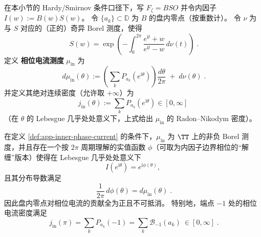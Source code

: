 \begin{definition}[内因子相位电流测度]\label{def:app-inner-phase-current}
在本小节的 Hardy/Smirnov 条件口径下，写 \(F_{\zeta}=BSO\) 并令内因子 \(I(w):=B(w)S(w)\)。
令 \(\{a_k\}\subset\mathbb{D}\) 为 \(B\) 的盘内零点（按重数计）。
令 \(\nu\) 为与 \(S\) 对应的（正的）奇异 Borel 测度，使得
\begin{equation}\label{eq:app-singular-inner-factor-measure}
\boxed{\;
S(w)
=\exp\!\left(
-\int_{0}^{2\pi}\frac{e^{\mathrm{i}t}+w}{e^{\mathrm{i}t}-w}\,d\nu(t)
\right)\; }.
\end{equation}
定义 \textbf{相位电流测度} \(\mu_{\mathrm{in}}\) 为
\begin{equation}\label{eq:app-inner-phase-current-measure}
\boxed{\;
d\mu_{\mathrm{in}}(\theta)
:=
\left(\sum_k P_{a_k}(e^{\mathrm{i}\theta})\right)\frac{d\theta}{2\pi}
\;+\;
d\nu(\theta)\; }.
\end{equation}
并定义其绝对连续密度（允许取 \(+\infty\)）为
\begin{equation}\label{eq:app-inner-phase-current-density}
\boxed{\;
j_{\mathrm{in}}(\theta):=\sum_k P_{a_k}(e^{\mathrm{i}\theta})\in[0,\infty]\;}
\end{equation}
（在 \(\theta\) 的 Lebesgue 几乎处处意义下，上式给出 \(\mu_{\mathrm{in}}\) 的 Radon--Nikodym 密度）。
\end{definition}

\begin{theorem}\label{thm:app-inner-phase-current-poisson}
在定义 \ref{def:app-inner-phase-current} 的条件下，\(\mu_{\mathrm{in}}\) 为 \(\TT\) 上的非负 Borel 测度，并且存在一个按 \(2\pi\) 周期理解的实值函数 \(\phi\)（可取为内因子边界相位的“解缠”版本）使得在 Lebesgue 几乎处处意义下
\[
I(e^{\mathrm{i}\theta})=e^{\mathrm{i}\phi(\theta)},
\]
且其分布导数满足
\begin{equation}\label{eq:app-inner-phase-current-as-arg-derivative}
\boxed{\;
\frac{1}{2\pi}\,d\phi(\theta)=d\mu_{\mathrm{in}}(\theta)\; }.
\end{equation}
因此盘内零点对相位电流的贡献全为正且不可抵消。
特别地，端点 \(-1\) 处的相位电流密度满足
\begin{equation}\label{eq:app-endpoint-phase-current-lowerbound}
\boxed{\;
j_{\mathrm{in}}(\pi)
=\sum_k P_{a_k}(-1)
=\sum_k \mathcal{B}_{-1}(a_k)\ \in[0,\infty]\; }.
\end{equation}
\end{theorem}

